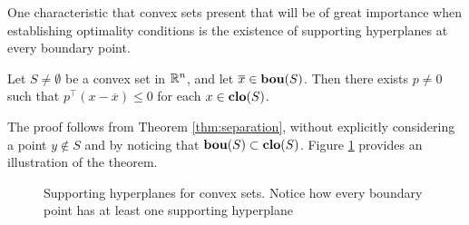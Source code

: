 One characteristic that convex sets present that will be of great importance when establishing optimality conditions is the existence of supporting hyperplanes at every boundary point.

\begin{theorem}
	Let $S \neq \emptyset$ be a convex set in $\mathbb{R}^n$, and let $\overline{x} \in \mathop{\bf bou}(S)$. Then there exists $p \neq 0$ such that $p^\top(x - \overline{x}) \leq 0$ for each $x \in \mathop{\bf clo}(S)$.
\end{theorem}

The proof follows from Theorem \ref{thm:separation}, without explicitly considering a point $y \notin S$ and by noticing that $\mathop{\bf bou}(S) \subset \mathop{\bf clo}(S)$. Figure \ref{fig:support_convex} provides an illustration of the theorem. 

\begin{figure}[H]
	\caption{Supporting hyperplanes for convex sets. Notice how every boundary point has at least one supporting hyperplane} \label{fig:support_convex}
\end{figure}

